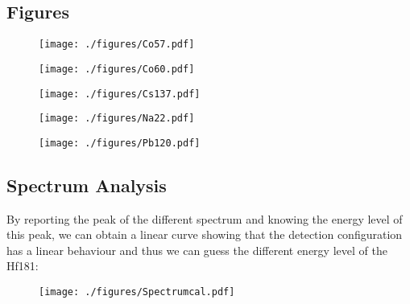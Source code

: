 \documentclass[a4paper,12pt,oneside]{article}
\begin{document}
\subsection{Figures}

\begin{figure}[H]
  \begin{center}
  \texttt{[image: ./figures/Co57.pdf]}
  \caption{} \label{fig:Co57}
  \end{center}
\end{figure}

\begin{figure}[H]
  \begin{center}
  \texttt{[image: ./figures/Co60.pdf]}
  \caption{} \label{fig:Co60}
  \end{center}
\end{figure}

\begin{figure}[H]
  \begin{center}
  \texttt{[image: ./figures/Cs137.pdf]}
  \caption{} \label{fig:Cs137}
  \end{center}
\end{figure}

\begin{figure}[H]
  \begin{center}
  \texttt{[image: ./figures/Na22.pdf]}
  \caption{} \label{fig:Na22}
  \end{center}
\end{figure}

\begin{figure}[H]
  \begin{center}
  \texttt{[image: ./figures/Pb120.pdf]}
  \caption{} \label{fig:Pb120}
  \end{center}
\end{figure}

\subsection{Spectrum Analysis}
By reporting the peak of the different spectrum and knowing the energy level of this peak, we can obtain a linear curve showing that the detection configuration has a linear behaviour and thus we can guess the different energy level of the Hf181:

\begin{figure}[H]
  \begin{center}
  \texttt{[image: ./figures/Spectrumcal.pdf]}
  \caption{} \label{fig:calibrate}
  \end{center}
\end{figure}
\end{document}
